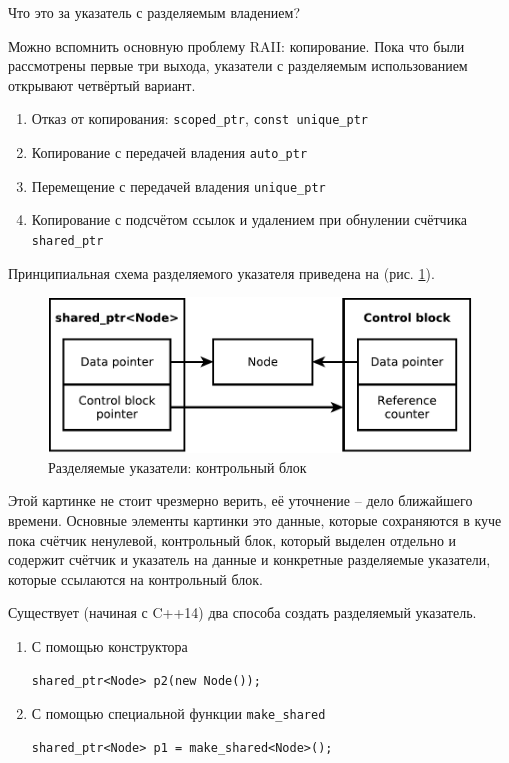 \documentclass[a4paper,12pt,oneside]{book}
\begin{document}
Что это за указатель с разделяемым владением?

Можно вспомнить основную проблему RAII: копирование. Пока что были рассмотрены первые три выхода, указатели с разделяемым использованием открывают четвёртый вариант.

\begin{enumerate}
\item Отказ от копирования: \lstinline!scoped_ptr!, \lstinline!const unique_ptr!
\item Копирование с передачей владения \lstinline!auto_ptr!
\item Перемещение с передачей владения \lstinline!unique_ptr!
\item Копирование с подсчётом ссылок и удалением при обнулении счётчика \lstinline!shared_ptr! 
\end{enumerate}

Принципиальная схема разделяемого указателя приведена на (рис. \ref{fig:smartptrs-outer}).

\begin{figure}[ht]
\centering
\includegraphics[width=1.0\textwidth]{illustrations/smartptrs-outer-crop.pdf}
\caption{Разделяемые указатели: контрольный блок}
\label{fig:smartptrs-outer}
\end{figure}

Этой картинке не стоит чрезмерно верить, её уточнение -- дело ближайшего времени. Основные элементы картинки это данные, которые сохраняются в куче пока счётчик ненулевой, контрольный блок, который выделен отдельно и содержит счётчик и указатель на данные и конкретные разделяемые указатели, которые ссылаются на контрольный блок.

Существует (начиная с C++14) два способа создать разделяемый указатель.

\begin{enumerate}
\item С помощью конструктора 
\begin{lstlisting}
shared_ptr<Node> p2(new Node());
\end{lstlisting}
\item С помощью специальной функции \lstinline!make_shared!
\begin{lstlisting}
shared_ptr<Node> p1 = make_shared<Node>();
\end{lstlisting}
\end{enumerate}
\end{document}
